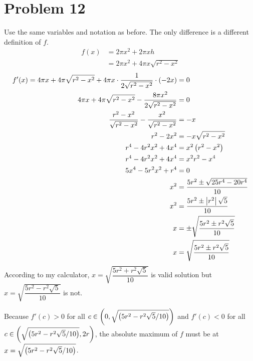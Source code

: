 \documentclass{article}
\newcommand*{\paren}[1]{\ensuremath\left(#1\right)}
\newcommand*{\problem}[1]{\section*{Problem #1}}
\newcommand*{\abs}[1]{\ensuremath{\left|#1\right|}}
\begin{document}
\problem{12}
Use the same variables and notation as before. The only difference is a different definition of $f$.
\begin{align*}
	f(x)&=2\pi x^2+2\pi xh \\
	&=2\pi x^2+4\pi x\sqrt{r^2-x^2}
\end{align*}
\begin{align*}
	f'(x)=4\pi x+4\pi\sqrt{r^2-x^2}+4\pi x\cdot\frac{1}{2\sqrt{r^2-x^2}}\cdot(-2x)&=0 \\
	4\pi x+4\pi\sqrt{r^2-x^2}-\frac{8\pi x^2}{2\sqrt{r^2-x^2}}&=0 \\
	\frac{r^2-x^2}{\sqrt{r^2-x^2}}-\frac{x^2}{\sqrt{r^2-x^2}}&=-x \\
	r^2-2x^2&=-x\sqrt{r^2-x^2} \\
	r^4-4r^2x^2+4x^4&=x^2\paren{r^2-x^2} \\
	r^4-4r^2x^2+4x^4&=x^2r^2-x^4 \\
	5x^4-5r^2x^2+r^4&=0 \\
	x^2&=\frac{5r^2\pm\sqrt{25r^4-20r^4}}{10} \\
	x^2&=\frac{5r^2\pm\abs{r^2}\sqrt{5}}{10} \\
	x&=\pm\sqrt{\frac{5r^2\pm r^2\sqrt{5}}{10}} \\
	x&=\sqrt{\frac{5r^2\pm r^2\sqrt{5}}{10}}
\end{align*}
According to my calculator, $x=\sqrt{\dfrac{5r^2+r^2\sqrt{5}}{10}}$
is valid solution but $x=\sqrt{\dfrac{5r^2-r^2\sqrt{5}}{10}}$ is not.
\begin{center}
\end{center}
Because $f'(c)>0$ for all $c\in\paren{0,\sqrt{\paren{5r^2-r^2\sqrt{5}/10}}}$ and $f'(c)<0$ for all $c\in\paren{\sqrt{\paren{5r^2-r^2\sqrt{5}/10}},2r}$, the absolute maximum of $f$ must be at $x=\sqrt{\paren{5r^2-r^2\sqrt{5}/10}}$.
\end{document}
